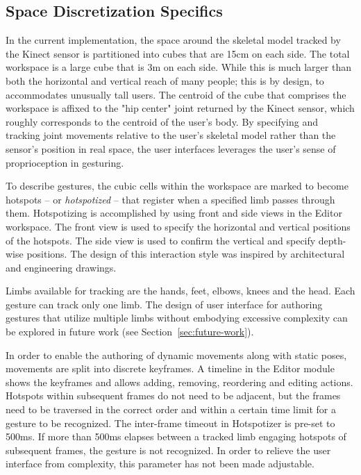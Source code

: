 \subsection{Space Discretization Specifics}

In the current implementation, the space around the skeletal model tracked by the Kinect sensor is partitioned into cubes that are 15cm on each side. The total workspace is a large cube that is 3m on each side. While this is much larger than both the horizontal and vertical reach of many people; this is by design, to accommodates unusually tall users. The centroid of the cube that comprises the workspace is affixed to the "hip center" joint returned by the Kinect sensor, which roughly corresponds to the centroid of the user's body. By specifying and tracking joint movements relative to the user’s skeletal model rather than the sensor’s position in real space, the user interfaces leverages the user’s sense of proprioception \parencite{Shoemaker:2010} in gesturing.

To describe gestures, the cubic cells within the workspace are marked to become hotspots – or \emph{hotspotized} – that register when a specified limb passes through them. Hotspotizing is accomplished by using front and side views in the Editor workspace. The front view is used to specify the horizontal and vertical positions of the hotspots. The side view is used to confirm the vertical and specify depth-wise positions. The design of this interaction style was inspired by architectural and engineering drawings.

Limbs available for tracking are the hands, feet, elbows, knees and the head. Each gesture can track only one limb. The design of user interface for authoring gestures that utilize multiple limbs without embodying excessive complexity can be explored in future work (see Section~\ref{sec:future-work}).

In order to enable the authoring of dynamic movements along with static poses, movements are split into discrete keyframes. A timeline in the Editor module shows the keyframes and allows adding, removing, reordering and editing actions. Hotspots within subsequent frames do not need to be adjacent, but the frames need to be traversed in the correct order and within a certain time limit for a gesture to be recognized. The inter-frame timeout in Hotspotizer is pre-set to 500ms. If more than 500ms elapses between a tracked limb engaging hotspots of subsequent frames, the gesture is not recognized. In order to relieve the user interface from complexity, this parameter has not been made adjustable.


